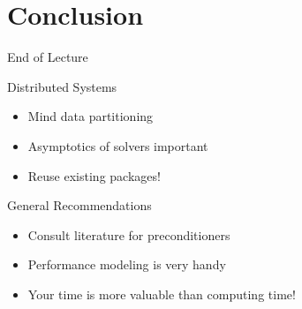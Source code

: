 \section{Conclusion}
\begin{frame}{End of Lecture}
 
 \begin{block}{Distributed Systems}
  \begin{itemize}
   \item Mind data partitioning
   \item Asymptotics of solvers important
   \item Reuse existing packages!
  \end{itemize}
 \end{block}

 \pause
 \begin{block}{General Recommendations}
  \begin{itemize}
   \item Consult literature for preconditioners
   \item Performance modeling is very handy
   \item Your time is more valuable than computing time!
  \end{itemize}
 \end{block}

\end{frame}
